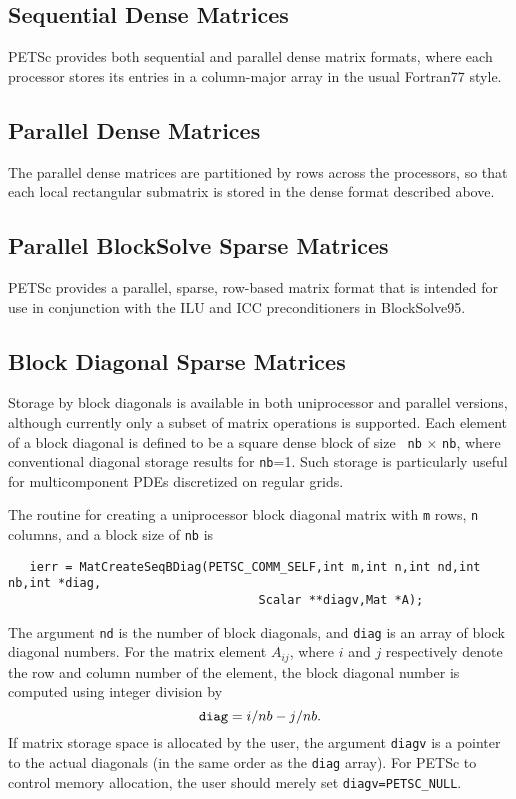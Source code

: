 \subsection{Sequential Dense Matrices}

PETSc provides both sequential and parallel dense matrix formats,
where each processor stores its entries in a column-major array in the
usual Fortran77 style. 

\subsection{Parallel Dense Matrices}

The parallel dense matrices are partitioned by rows across the
processors, so that each local rectangular submatrix is stored in the
dense format described above.

\subsection{Parallel BlockSolve Sparse Matrices}

PETSc provides a parallel, sparse, row-based matrix format that is
intended for use in conjunction with the ILU and ICC preconditioners
in BlockSolve95.  

\subsection{Block Diagonal Sparse Matrices}
\label{sec:bdiag}

Storage  by block diagonals is
available in both uniprocessor and parallel versions, although currently
only a subset of matrix operations is supported.  Each element of
a block diagonal is defined to be a square dense block of size {\tt
nb} $\times$ {\tt nb}, where conventional diagonal storage results for
{\tt nb}=1.  Such storage is particularly useful for multicomponent PDEs
discretized on regular grids.

The routine for creating a uniprocessor block diagonal matrix with {\tt m} 
rows, {\tt n} columns, and a block size of {\tt nb} is
\begin{verbatim}
   ierr = MatCreateSeqBDiag(PETSC_COMM_SELF,int m,int n,int nd,int nb,int *diag,
                                   Scalar **diagv,Mat *A);
\end{verbatim}
The  argument {\tt nd} is the number of 
block diagonals, and {\tt diag} is
an array of block diagonal numbers.  For the matrix element $A_{ij}$,
where $i$ and $j$ respectively denote the row and column number of the 
element, the block diagonal number is computed using integer division by
\[ {\tt diag} = i/nb - j/nb. \]
If matrix storage space is allocated by the user, the argument {\tt diagv} 
is a pointer to the actual diagonals (in the same order as the {\tt diag} 
array).  For PETSc to control memory allocation, the user should merely
set {\tt diagv=PETSC\_NULL}.

